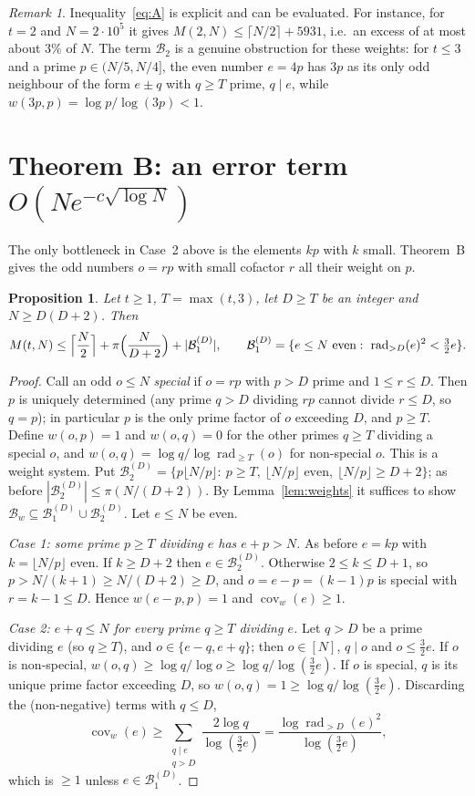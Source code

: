 \documentclass[11pt]{amsart}
\newtheorem{proposition}[lemma]{Proposition}
\theoremstyle{definition}
\theoremstyle{remark}
\newtheorem{remark}[lemma]{Remark}
\newcommand{\rad}{\operatorname{rad}}
\newcommand{\cov}{\operatorname{cov}}
\newcommand{\Bad}{\mathcal{B}}
\begin{document}
\begin{remark}
Inequality~\eqref{eq:A} is explicit and can be evaluated. For instance, for $t=2$ and $N=2\cdot10^5$ it gives $M(2,N)\le\lceil N/2\rceil+5931$, i.e.\ an excess of at most about $3\%$ of $N$. The term $\Bad_2$ is a genuine obstruction for these weights: for $t\le3$ and a prime $p\in(N/5,N/4]$, the even number $e=4p$ has $3p$ as its only odd neighbour of the form $e\pm q$ with $q\ge T$ prime, $q\mid e$, while $w(3p,p)=\log p/\log(3p)<1$.
\end{remark}

\section{\texorpdfstring{Theorem B: an error term $O(Ne^{-c\sqrt{\log N}})$}{Theorem B: an error term O(N exp(-c sqrt(log N)))}}

The only bottleneck in Case~2 above is the elements $kp$ with $k$ small. Theorem~B gives the odd numbers $o=rp$ with small cofactor $r$ all their weight on $p$.

\begin{proposition}\label{prop:D}
Let $t\ge1$, $T=\max(t,3)$, let $D\ge T$ be an integer and $N\ge D(D+2)$. Then
\[
M(t,N)\le\Bigl\lceil\frac N2\Bigr\rceil+\pi\Bigl(\frac N{D+2}\Bigr)+|\Bad_1^{(D)}|,\qquad
\Bad_1^{(D)}=\{e\le N\text{ even}:\ \rad_{>D}(e)^2<\tfrac32e\}.
\]
\end{proposition}

\begin{proof}
Call an odd $o\le N$ \emph{special} if $o=rp$ with $p>D$ prime and $1\le r\le D$. Then $p$ is uniquely determined (any prime $q>D$ dividing $rp$ cannot divide $r\le D$, so $q=p$); in particular $p$ is the only prime factor of $o$ exceeding $D$, and $p\ge T$. Define $w(o,p)=1$ and $w(o,q)=0$ for the other primes $q\ge T$ dividing a special $o$, and $w(o,q)=\log q/\log\rad_{\ge T}(o)$ for non-special $o$. This is a weight system. Put
$\Bad_2^{(D)}=\{p\lfloor N/p\rfloor:\ p\ge T,\ \lfloor N/p\rfloor\text{ even},\ \lfloor N/p\rfloor\ge D+2\}$; as before $|\Bad_2^{(D)}|\le\pi(N/(D+2))$. By Lemma~\ref{lem:weights} it suffices to show $\Bad_w\subseteq\Bad_1^{(D)}\cup\Bad_2^{(D)}$. Let $e\le N$ be even.

\emph{Case 1: some prime $p\ge T$ dividing $e$ has $e+p>N$.} As before $e=kp$ with $k=\lfloor N/p\rfloor$ even. If $k\ge D+2$ then $e\in\Bad_2^{(D)}$. Otherwise $2\le k\le D+1$, so $p>N/(k+1)\ge N/(D+2)\ge D$, and $o=e-p=(k-1)p$ is special with $r=k-1\le D$. Hence $w(e-p,p)=1$ and $\cov_w(e)\ge1$.

\emph{Case 2: $e+q\le N$ for every prime $q\ge T$ dividing $e$.} Let $q>D$ be a prime dividing $e$ (so $q\ge T$), and $o\in\{e-q,e+q\}$; then $o\in[N]$, $q\mid o$ and $o\le\frac32e$. If $o$ is non-special, $w(o,q)\ge\log q/\log o\ge\log q/\log(\frac32e)$. If $o$ is special, $q$ is its unique prime factor exceeding $D$, so $w(o,q)=1\ge\log q/\log(\frac32e)$. Discarding the (non-negative) terms with $q\le D$,
\[
\cov_w(e)\ge\sum_{\substack{q\mid e\\ q>D}}\frac{2\log q}{\log(\frac32e)}=\frac{\log\rad_{>D}(e)^2}{\log(\frac32e)},
\]
which is $\ge1$ unless $e\in\Bad_1^{(D)}$.
\end{proof}
\end{document}
